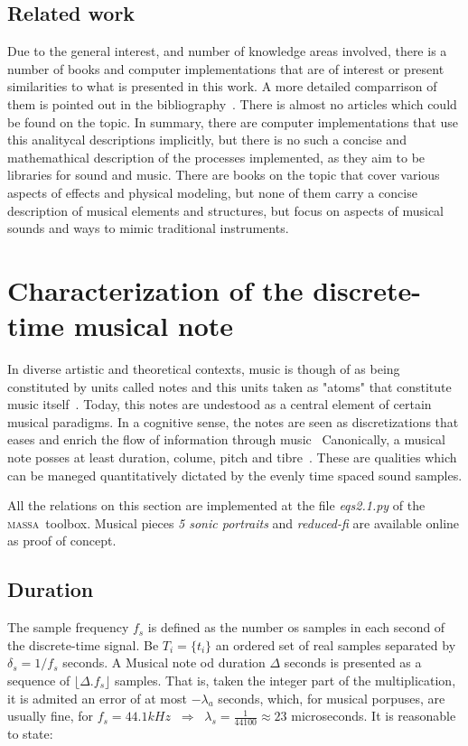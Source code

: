 \documentclass[
 aip,
 jmp,
 amsmath,amssymb,
 reprint,
]{revtex4-1}
\newcommand{\massa}{{\large \textsc{massa}}}
\begin{document}
\subsection{Related work}
Due to the general interest, and number of knowledge areas involved, there is a number of books and computer implementations that are of interest or present similarities to what is presented in this work. A more detailed comparrison of them is pointed out in the bibliography~\cite{dissertacao}. There is almost no articles which could be found on the topic. In summary, there are computer implementations that use this analitycal descriptions implicitly, but there is no such a concise and mathemathical description of the processes implemented, as they aim to be libraries for sound and music. There are books on the topic that cover various aspects of effects and physical modeling, but none of them carry a concise description of musical elements and structures, but focus on aspects of musical sounds and ways to mimic traditional instruments.


\section{Characterization of the discrete-time musical note}
In diverse artistic and theoretical contexts, music is though of as being constituted by units called notes and this units taken as "atoms" that constitute music itself~\cite{Wisnick, Lovelock, Webern}.
Today, this notes are undestood as a central element of certain musical paradigms. In a cognitive sense, the notes are seen as discretizations that eases and enrich the flow of information through music~\cite{Roederer, Lacerda}
Canonically, a musical note posses at least duration, colume, pitch and tibre~\cite{Lacerda}. These are qualities which can be maneged quantitatively dictated by the evenly time spaced sound samples.

All the relations on this section are implemented at the file \emph{eqs2.1.py} of the \massa\ toolbox. Musical pieces \emph{5 sonic portraits} and \emph{reduced-fi} are available online as proof of concept.

\subsection{Duration}
The sample frequency $f_s$ is defined as the number os samples in each second of the discrete-time signal. Be $T_i=\{t_i\}$ an ordered set of real samples separated by $\delta_s=1/f_s$ seconds. A Musical note od duration $\Delta$ seconds is presented as a sequence of $\lfloor \Delta . f_s \rfloor $ samples. That is, taken the integer part of the multiplication, it is admited an error of at most $-\lambda_a$ seconds, which, for musical porpuses, are usually fine, for $f_s=44.1kHz \;\;\Rightarrow\;\;\lambda_s=\frac{1}{44100}\approx 23$ microseconds. It is reasonable to state:
\end{document}
